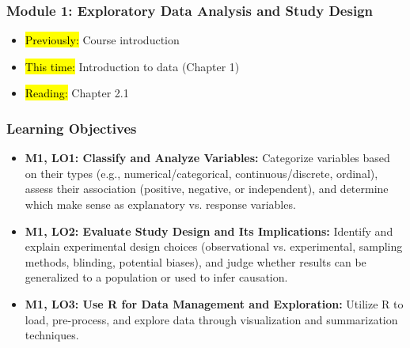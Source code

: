 
\begin{frame}
    \frametitle{Module 1: Exploratory Data Analysis and Study Design}
    \begin{itemize}
        \item \hl{Previously: }Course introduction
        \item \hl{This time: }Introduction to data (Chapter 1)
        \item \hl{Reading: }Chapter 2.1
    \end{itemize}

\end{frame}
\begin{frame}
    \frametitle{Learning Objectives}
    \begin{itemize}
        \item \textbf{M1, LO1: Classify and Analyze Variables:} Categorize variables based on their types (e.g., numerical/categorical, continuous/discrete, ordinal), assess their association (positive, negative, or independent), and determine which make sense as explanatory vs. response variables.
        \item \textbf{M1, LO2: Evaluate Study Design and Its Implications:} Identify and explain experimental design choices (observational vs. experimental, sampling methods, blinding, potential biases), and judge whether results can be generalized to a population or used to infer causation.
        \item \textbf{M1, LO3: Use R for Data Management and Exploration:} Utilize R to load, pre-process, and explore data through visualization and summarization techniques.
    \end{itemize}
\end{frame}
